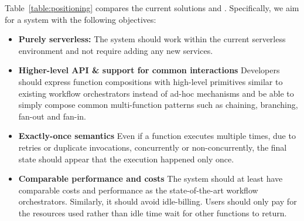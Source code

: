 Table~\ref{table:positioning} compares the current solutions and \name{}. Specifically, we aim for a system with the following objectives:
\begin{itemize}
	\item \textbf{Purely serverless: } The system should work within the current
serverless environment and not require adding any new services. 
	\item \textbf{Higher-level API \& support for common interactions} Developers should express
function compositions with high-level primitives similar to existing workflow
orchestrators instead of ad-hoc mechanisms and be able to simply compose common multi-function patterns such as chaining,
branching, fan-out and fan-in.
\item \textbf{Exactly-once semantics} Even if a function executes multiple times,
	due to retries or duplicate invocations, concurrently or non-concurrently, the
	final state should appear that the execution happened only once.
\item \textbf{Comparable performance and costs} The system should at least have
comparable costs and performance as the state-of-the-art workflow
orchestrators. Similarly, it should avoid idle-billing. Users should only pay for the resources
used rather than idle time wait for other functions to return.  
\end{itemize}





